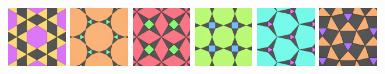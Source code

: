 \documentclass{beamer}
\begin{document}
\begin{frame}
  \includegraphics[width=0.6in]{hh07}
  \hspace{0.1mm}
  \includegraphics[width=0.6in]{hh08}
  \hspace{0.1mm}
  \includegraphics[width=0.6in]{hh09}
  \hspace{0.1mm}
  \includegraphics[width=0.6in]{hh10}
  \hspace{0.1mm}
  \includegraphics[width=0.6in]{hh11}
  \hspace{0.1mm}
  \includegraphics[width=0.6in]{hh12}\\[0.7mm]


\end{frame}
\end{document}
